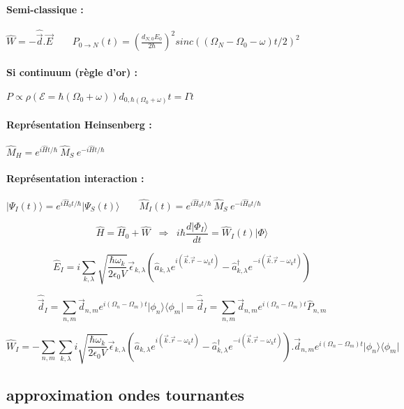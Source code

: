 \documentclass{article}
\begin{document}
\paragraph{Semi-classique :} $\hat{W}=-\hat{\vec{d}}.\vec{E} \qquad P_{0\rightarrow N}(t)=\left(\frac{d_{N,0}E_0}{2\hbar}\right)^2 sinc((\Omega_N -\Omega_0 -\omega)t/2)^2$

\paragraph{Si continuum (règle d'or) :} $P \propto \rho(\mathcal{E}=\hbar(\Omega_0 +\omega))d_{0,\hbar(\Omega_0 +\omega)}t =\Gamma t$

\paragraph{Représentation Heinsenberg :} $\hat{M}_H = e^{i\hat{H}t/\hbar}\:\hat{M}_S\:e^{-i\hat{H}t/\hbar}$

\paragraph{Représentation interaction :} $\vert \Psi_I(t)\rangle = e^{i\hat{H}_0t/\hbar}\vert\Psi_S(t)\rangle \qquad \hat{M}_I(t) = e^{i\hat{H}_0t/\hbar}\:\hat{M}_S\:e^{-i\hat{H}_0t/\hbar}$

$$ \hat{H} = \hat{H}_0 + \hat{W} \;\; \Rightarrow \;\; i\hbar\frac{d\vert\Phi_I\rangle}{dt} = \hat{W}_I(t)\vert\Phi\rangle$$

$$\hat{E}_I = i\sum_{k,\lambda}\sqrt{\frac{\hbar\omega_k}{2\epsilon_0V}}\vec{\epsilon}_{k,\lambda}(\hat{a}_{k,\lambda}e^{i(\vec{k}.\vec{r}-\omega_kt)} - \hat{a}^{\dagger}_{k,\lambda}e^{-i(\vec{k}.\vec{r}-\omega_kt)})$$

$$\hat{\vec{d}}_I = \sum_{n,m} \vec{d}_{n,m}e^{i(\Omega_n-\Omega_m)t}\vert\phi_n\rangle\langle\phi_m\vert = \hat{\vec{d}}_I = \sum_{n,m} \vec{d}_{n,m}e^{i(\Omega_n-\Omega_m)t}\hat{P}_{n,m}$$

$$\hat{W}_I = -\sum_{n,m}\sum_{k,\lambda}i\sqrt{\frac{\hbar\omega_k}{2\epsilon_0V}}\vec{\epsilon}_{k,\lambda}(\hat{a}_{k,\lambda}e^{i(\vec{k}.\vec{r}-\omega_kt)} - \hat{a}^{\dagger}_{k,\lambda}e^{-i(\vec{k}.\vec{r}-\omega_kt)}).\vec{d}_{n,m}e^{i(\Omega_n-\Omega_m)t}\vert\phi_n\rangle\langle\phi_m\vert$$

\subsection{approximation ondes tournantes}
\end{document}
